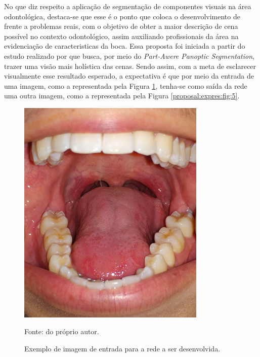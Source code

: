 No que diz respeito a aplicação de segmentação de componentes visuais na área odontológica, destaca-se que esse é o ponto que coloca o desenvolvimento de frente a problemas reais, com o objetivo de obter a maior descrição de cena possível no contexto odontológico, assim auxiliando profissionais da área na evidenciação de caracteristicas da boca. Essa proposta foi iniciada a partir do estudo realizado por \cite{DeGeus2021} que busca, por meio do \textit{Part-Awere Panoptic Segmentation}, trazer uma visão mais holística das cenas. Sendo assim, com a meta de esclarecer visualmente esse resultado esperado, a expectativa é que por meio da entrada de uma imagem, como a representada pela Figura \ref{proposal:expres:fig:4}, tenha-se como saída da rede uma outra imagem, como a representada pela Figura \ref{proposal:expres:fig:5}.

\begin{figure}[H]
    \centering
    \caption{Exemplo de imagem de entrada para a rede a ser desenvolvida.}
    \includegraphics[height=4.3in]{recursos/imagens/proposal/boca.png}
    \label{proposal:expres:fig:4}

    \vspace*{1 cm}
    Fonte: do próprio autor.
\end{figure}

